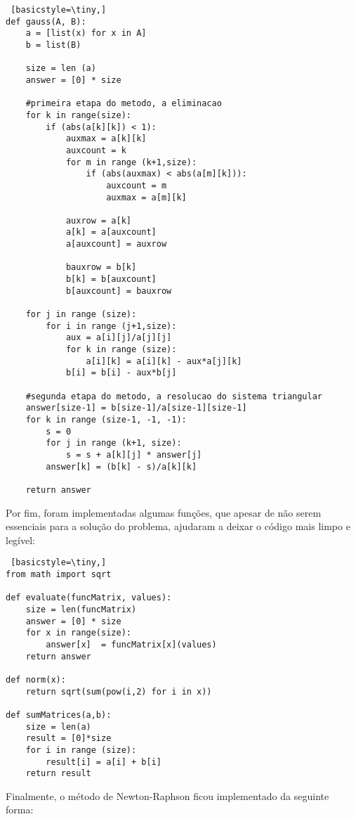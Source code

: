 \documentclass[12pt,A4]{report}
\begin{document}
\begin{lstlisting} [basicstyle=\tiny,]
def gauss(A, B):
    a = [list(x) for x in A]
    b = list(B)
    
    size = len (a)
    answer = [0] * size
    
    #primeira etapa do metodo, a eliminacao
    for k in range(size):
        if (abs(a[k][k]) < 1):
            auxmax = a[k][k]
            auxcount = k
            for m in range (k+1,size):
                if (abs(auxmax) < abs(a[m][k])):
                    auxcount = m
                    auxmax = a[m][k]
                    
            auxrow = a[k]
            a[k] = a[auxcount]
            a[auxcount] = auxrow
        
            bauxrow = b[k]
            b[k] = b[auxcount]
            b[auxcount] = bauxrow
             
    for j in range (size):
        for i in range (j+1,size):
            aux = a[i][j]/a[j][j]
            for k in range (size):
                a[i][k] = a[i][k] - aux*a[j][k]
            b[i] = b[i] - aux*b[j]
            
    #segunda etapa do metodo, a resolucao do sistema triangular
    answer[size-1] = b[size-1]/a[size-1][size-1]
    for k in range (size-1, -1, -1):
        s = 0
        for j in range (k+1, size):
            s = s + a[k][j] * answer[j]
        answer[k] = (b[k] - s)/a[k][k]
    
    return answer
\end{lstlisting}

Por fim, foram implementadas algumas funções, que apesar de não serem essenciais para a solução do problema, ajudaram a deixar o código mais limpo e legível:

\begin{lstlisting} [basicstyle=\tiny,]
from math import sqrt

def evaluate(funcMatrix, values):
    size = len(funcMatrix)
    answer = [0] * size
    for x in range(size):
        answer[x]  = funcMatrix[x](values)
    return answer
    
def norm(x):
    return sqrt(sum(pow(i,2) for i in x))

def sumMatrices(a,b):
    size = len(a)
    result = [0]*size
    for i in range (size):
        result[i] = a[i] + b[i]
    return result
\end{lstlisting}

Finalmente, o método de Newton-Raphson ficou implementado da seguinte forma:
\end{document}
